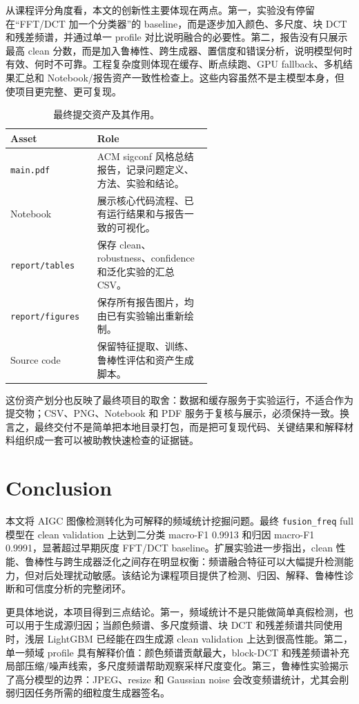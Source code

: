 \documentclass[sigconf,nonacm]{acmart}
\begin{document}
从课程评分角度看，本文的创新性主要体现在两点。第一，实验没有停留在“FFT/DCT 加一个分类器”的 baseline，而是逐步加入颜色、多尺度、块 DCT 和残差频谱，并通过单一 profile 对比说明融合的必要性。第二，报告没有只展示最高 clean 分数，而是加入鲁棒性、跨生成器、置信度和错误分析，说明模型何时有效、何时不可靠。工程复杂度则体现在缓存、断点续跑、GPU fallback、多机结果汇总和 Notebook/报告资产一致性检查上。这些内容虽然不是主模型本身，但使项目更完整、更可复现。

\begin{table}[H]
  \centering
  \caption{最终提交资产及其作用。}
  \label{tab:submission-assets}
  \begin{tabular}{lp{0.58\linewidth}}
    \toprule
    Asset & Role \\
    \midrule
    \texttt{main.pdf} & ACM sigconf 风格总结报告，记录问题定义、方法、实验和结论。 \\
    Notebook & 展示核心代码流程、已有运行结果和与报告一致的可视化。 \\
    \texttt{report/tables} & 保存 clean、robustness、confidence 和泛化实验的汇总 CSV。 \\
    \texttt{report/figures} & 保存所有报告图片，均由已有实验输出重新绘制。 \\
    Source code & 保留特征提取、训练、鲁棒性评估和资产生成脚本。 \\
    \bottomrule
  \end{tabular}
\end{table}

这份资产划分也反映了最终项目的取舍：数据和缓存服务于实验运行，不适合作为提交物；CSV、PNG、Notebook 和 PDF 服务于复核与展示，必须保持一致。换言之，最终交付不是简单把本地目录打包，而是把可复现代码、关键结果和解释材料组织成一套可以被助教快速检查的证据链。

\section{Conclusion}
本文将 AIGC 图像检测转化为可解释的频域统计挖掘问题。最终 \texttt{fusion\_freq} full 模型在 clean validation 上达到二分类 macro-F1 0.9913 和归因 macro-F1 0.9991，显著超过早期灰度 FFT/DCT baseline。扩展实验进一步指出，clean 性能、鲁棒性与跨生成器泛化之间存在明显权衡：频谱融合特征可以大幅提升检测能力，但对后处理扰动敏感。该结论为课程项目提供了检测、归因、解释、鲁棒性诊断和可信度分析的完整闭环。

更具体地说，本项目得到三点结论。第一，频域统计不是只能做简单真假检测，也可以用于生成源归因；当颜色频谱、多尺度频谱、块 DCT 和残差频谱共同使用时，浅层 LightGBM 已经能在四生成源 clean validation 上达到很高性能。第二，单一频域 profile 具有解释价值：颜色频谱贡献最大，block-DCT 和残差频谱补充局部压缩/噪声线索，多尺度频谱帮助观察采样尺度变化。第三，鲁棒性实验揭示了高分模型的边界：JPEG、resize 和 Gaussian noise 会改变频谱统计，尤其会削弱归因任务所需的细粒度生成器签名。
\end{document}
